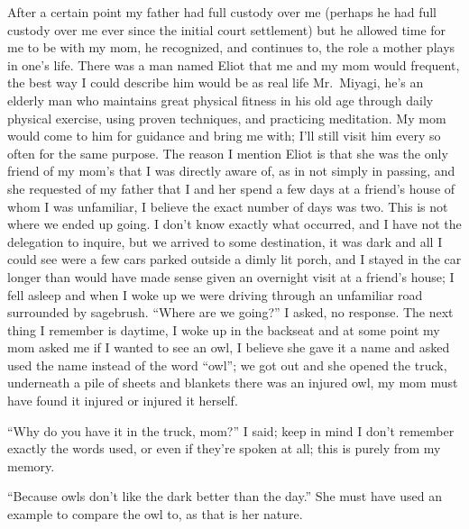 \documentclass[12pt]{article}
\begin{document}
After a certain point my father had full custody over me (perhaps he had full
custody over me ever since the initial court settlement) but he allowed time for
me to be with my mom, he recognized, and continues to, the role a mother plays
in one's life. There was a man named Eliot that me and my mom would frequent,
the best way I could describe him would be as real life Mr.\ Miyagi, he's an
elderly man who maintains great physical fitness in his old age through daily
physical exercise, using proven techniques, and practicing meditation. My mom
would come to him for guidance and bring me with; I'll still visit him every so
often for the same purpose. The reason I mention Eliot is that she was the only
friend of my mom's that I was directly aware of, as in not simply in passing,
and she requested of my father that I and her spend a few days at a friend's
house of whom I was unfamiliar, I believe the exact number of days was two. This
is not where we ended up going. I don't know exactly what occurred, and I have
not the delegation to inquire, but we arrived to some destination, it was dark
and all I could see were a few cars parked outside a dimly lit porch, and I
stayed in the car longer than would have made sense given an overnight visit at
a friend's house; I fell asleep and when I woke up we were driving through an
unfamiliar road surrounded by sagebrush. ``Where are we going?'' I asked, no
response. The next thing I remember is daytime, I woke up in the backseat and at
some point my mom asked me if I wanted to see an owl, I believe she gave it a
name and asked used the name instead of the word ``owl''; we got out and she
opened the truck, underneath a pile of sheets and blankets there was an injured
owl, my mom must have found it injured or injured it herself.

``Why do you have it in the truck, mom?'' I said; keep in mind I don't remember
exactly the words used, or even if they're spoken at all; this is purely from my
memory.

``Because owls don't like the dark better than the day.'' She must have used an
example to compare the owl to, as that is her nature.
\end{document}
